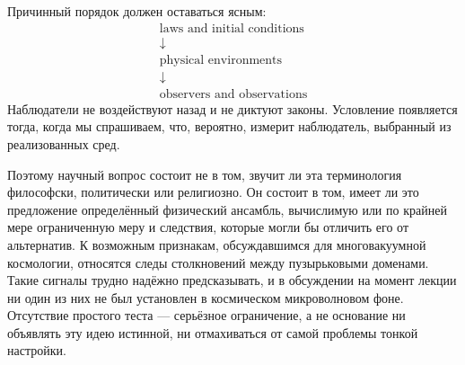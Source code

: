 \begin{classroomqa}
\end{classroomqa}

\begin{classroomqa}
\end{classroomqa}

Причинный порядок должен оставаться ясным:
\begin{equation}
\begin{gathered}
\text{laws and initial conditions}\\[-0.15em]
\downarrow\\[-0.15em]
\text{physical environments}\\[-0.15em]
\downarrow\\[-0.15em]
\text{observers and observations}
\end{gathered}
\end{equation}
Наблюдатели не воздействуют назад и не диктуют законы. Условление появляется тогда, когда мы спрашиваем, что, вероятно, измерит наблюдатель, выбранный из реализованных сред.

Поэтому научный вопрос состоит не в том, звучит ли эта терминология философски, политически или религиозно. Он состоит в том, имеет ли это предложение определённый физический ансамбль, вычислимую или по крайней мере ограниченную меру и следствия, которые могли бы отличить его от альтернатив. К возможным признакам, обсуждавшимся для многовакуумной космологии, относятся следы столкновений между пузырьковыми доменами. Такие сигналы трудно надёжно предсказывать, и в обсуждении на момент лекции ни один из них не был установлен в космическом микроволновом фоне. Отсутствие простого теста — серьёзное ограничение, а не основание ни объявлять эту идею истинной, ни отмахиваться от самой проблемы тонкой настройки.

